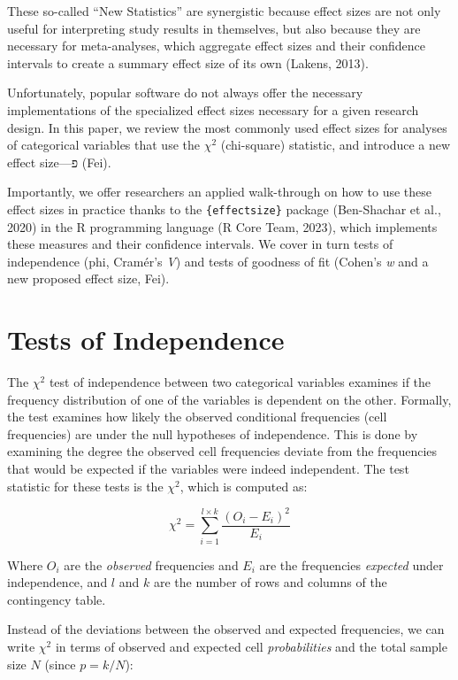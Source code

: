 \documentclass[
]{article}
\begin{document}
These so-called ``New Statistics'' are synergistic because effect sizes
are not only useful for interpreting study results in themselves, but
also because they are necessary for meta-analyses, which aggregate
effect sizes and their confidence intervals to create a summary effect
size of its own (Lakens, 2013).

Unfortunately, popular software do not always offer the necessary
implementations of the specialized effect sizes necessary for a given
research design. In this paper, we review the most commonly used effect
sizes for analyses of categorical variables that use the \(\chi^2\)
(chi-square) statistic, and introduce a new effect size---פ (Fei).

Importantly, we offer researchers an applied walk-through on how to use
these effect sizes in practice thanks to the \texttt{\{effectsize\}}
package (Ben-Shachar et al., 2020) in the R programming language (R Core
Team, 2023), which implements these measures and their confidence
intervals. We cover in turn tests of independence (phi, Cramér's
\emph{V}) and tests of goodness of fit (Cohen's \emph{w} and a new
proposed effect size, Fei).

\hypertarget{tests-of-independence}{%
\section{Tests of Independence}\label{tests-of-independence}}

The \(\chi^2\) test of independence between two categorical variables
examines if the frequency distribution of one of the variables is
dependent on the other. Formally, the test examines how likely the
observed conditional frequencies (cell frequencies) are under the null
hypotheses of independence. This is done by examining the degree the
observed cell frequencies deviate from the frequencies that would be
expected if the variables were indeed independent. The test statistic
for these tests is the \(\chi^2\), which is computed as:

\[
\chi^2 = \sum_{i=1}^{l\times k}{\frac{(O_i-E_i)^2}{E_i}}
\]

Where \(O_i\) are the \emph{observed} frequencies and \(E_i\) are the
frequencies \emph{expected} under independence, and \(l\) and \(k\) are
the number of rows and columns of the contingency table.

Instead of the deviations between the observed and expected frequencies,
we can write \(\chi^2\) in terms of observed and expected cell
\emph{probabilities} and the total sample size \(N\) (since \(p=k/N\)):
\end{document}
